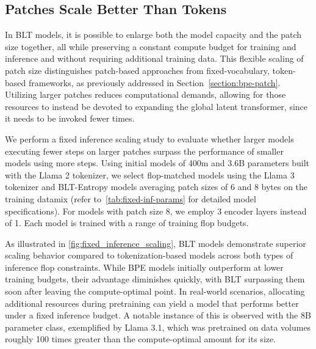 \subsection{Patches Scale Better Than Tokens} In {\textsc BLT} models, it is possible to enlarge both the model capacity and the patch size together, all while preserving a constant compute budget for training and inference and without requiring additional training data. This flexible scaling of patch size distinguishes patch-based approaches from fixed-vocabulary, token-based frameworks, as previously addressed in Section~\ref{section:bpe-patch}. Utilizing larger patches reduces computational demands, allowing for those resources to instead be devoted to expanding the global latent transformer, since it needs to be invoked fewer times.

We perform a fixed inference scaling study to evaluate whether larger models executing fewer steps on larger patches surpass the performance of smaller models using more steps. Using initial models of 400m and 3.6B parameters built with the Llama 2 tokenizer, we select flop-matched models using the Llama 3 tokenizer and {\textsc BLT}-Entropy models averaging patch sizes of 6 and 8 bytes on the training datamix (refer to~\autoref{tab:fixed-inf-params} for detailed model specifications). For models with patch size 8, we employ 3 encoder layers instead of 1. Each model is trained with a range of training flop budgets.

As illustrated in \autoref{fig:fixed_inference_scaling}, {\textsc BLT} models demonstrate superior scaling behavior compared to tokenization-based models across both types of inference flop constraints. While BPE models initially outperform at lower training budgets, their advantage diminishes quickly, with {\textsc BLT} surpassing them soon after leaving the compute-optimal point. In real-world scenarios, allocating additional resources during pretraining can yield a model that performs better under a fixed inference budget. A notable instance of this is observed with the 8B parameter class, exemplified by Llama 3.1, which was pretrained on data volumes roughly 100 times greater than the compute-optimal amount for its size.

